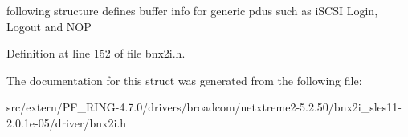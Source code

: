 following structure defines buffer info for generic pdus such as iSCSI Login, Logout and NOP 

Definition at line 152 of file bnx2i.h.



The documentation for this struct was generated from the following file:\begin{DoxyCompactItemize}
\item 
src/extern/PF\_\-RING-\/4.7.0/drivers/broadcom/netxtreme2-\/5.2.50/bnx2i\_\-sles11-\/2.0.1e-\/05/driver/bnx2i.h\end{DoxyCompactItemize}
